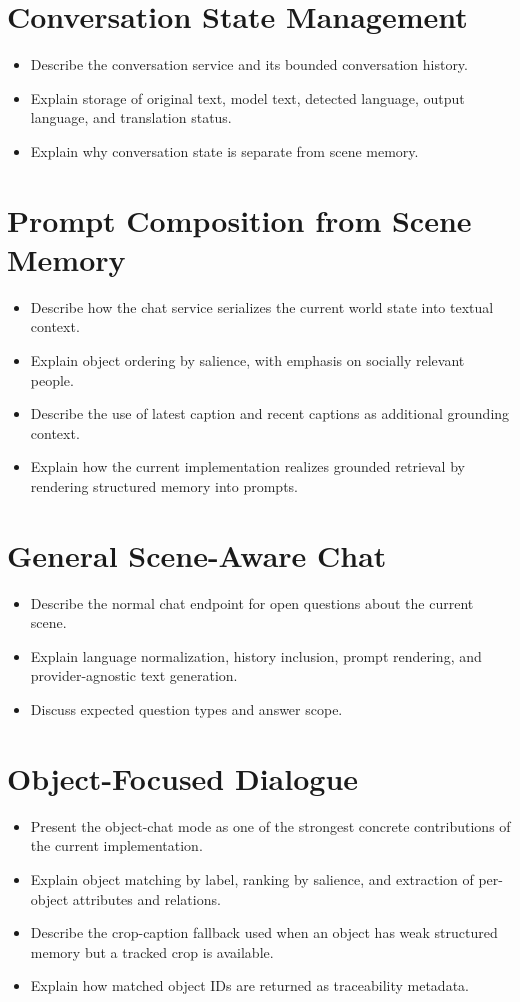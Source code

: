 \documentclass[
  digital,     %
  oneside,     %
  nosansbold,  %
  nocolorbold, %
  lof,         %
  lot,         %
]{fithesis4}
\begin{document}
\section{Conversation State Management}
\begin{itemize}
    \item Describe the conversation service and its bounded conversation history.
    \item Explain storage of original text, model text, detected language, output language, and translation status.
    \item Explain why conversation state is separate from scene memory.
\end{itemize}

\section{Prompt Composition from Scene Memory}
\begin{itemize}
    \item Describe how the chat service serializes the current world state into textual context.
    \item Explain object ordering by salience, with emphasis on socially relevant people.
    \item Describe the use of latest caption and recent captions as additional grounding context.
    \item Explain how the current implementation realizes grounded retrieval by rendering structured memory into prompts.
\end{itemize}

\section{General Scene-Aware Chat}
\begin{itemize}
    \item Describe the normal chat endpoint for open questions about the current scene.
    \item Explain language normalization, history inclusion, prompt rendering, and provider-agnostic text generation.
    \item Discuss expected question types and answer scope.
\end{itemize}

\section{Object-Focused Dialogue}
\begin{itemize}
    \item Present the object-chat mode as one of the strongest concrete contributions of the current implementation.
    \item Explain object matching by label, ranking by salience, and extraction of per-object attributes and relations.
    \item Describe the crop-caption fallback used when an object has weak structured memory but a tracked crop is available.
    \item Explain how matched object IDs are returned as traceability metadata.
\end{itemize}
\end{document}
